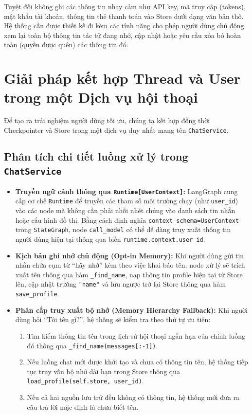 \begin{aiwarning}
Tuyệt đối không ghi các thông tin nhạy cảm như API key, mã truy cập (tokens), mật khẩu tài khoản, thông tin thẻ thanh toán vào Store dưới dạng văn bản thô. Hệ thống cần được thiết kế đi kèm các tính năng cho phép người dùng chủ động xem lại toàn bộ thông tin tác tử đang nhớ, cập nhật hoặc yêu cầu xóa bỏ hoàn toàn (quyền được quên) các thông tin đó.
\end{aiwarning}

\section{Giải pháp kết hợp Thread và User trong một Dịch vụ hội thoại}

Để tạo ra trải nghiệm người dùng tối ưu, chúng ta kết hợp đồng thời Checkpointer và Store trong một dịch vụ duy nhất mang tên \texttt{ChatService}.

\begingroup

\endgroup

\subsection{Phân tích chi tiết luồng xử lý trong \texttt{ChatService}}
\begin{itemize}
  \item \textbf{Truyền ngữ cảnh thông qua \texttt{Runtime[UserContext]}:} LangGraph cung cấp cơ chế \texttt{Runtime} để truyền các tham số môi trường chạy (như \texttt{user\_id}) vào các node mà không cần phải nhồi nhét chúng vào danh sách tin nhắn hoặc cấu hình đồ thị. Bằng cách định nghĩa \texttt{context\_schema=UserContext} trong \texttt{StateGraph}, node \texttt{call\_model} có thể dễ dàng truy xuất thông tin người dùng hiện tại thông qua biến \texttt{runtime.context.user\_id}.
  \item \textbf{Kịch bản ghi nhớ chủ động (Opt-in Memory):} Khi người dùng gửi tin nhắn chứa cụm từ ``hãy nhớ'' kèm theo việc khai báo tên, node xử lý sẽ trích xuất tên thông qua hàm \texttt{\_find\_name}, nạp thông tin profile hiện tại từ Store lên, cập nhật trường \texttt{"name"} và lưu ngược trở lại Store thông qua hàm \texttt{save\_profile}.
  \item \textbf{Phân cấp truy xuất bộ nhớ (Memory Hierarchy Fallback):} Khi người dùng hỏi ``Tôi tên gì?'', hệ thống sẽ kiểm tra theo thứ tự ưu tiên:
  \begin{enumerate}
    \item Tìm kiếm thông tin tên trong lịch sử hội thoại ngắn hạn của chính luồng đó thông qua \texttt{\_find\_name(messages[:-1])}.
    \item Nếu luồng chat mới được khởi tạo và chưa có thông tin tên, hệ thống tiếp tục truy vấn bộ nhớ dài hạn trong Store thông qua \texttt{load\_profile(self.store, user\_id)}.
    \item Nếu cả hai nguồn lưu trữ đều không có thông tin, hệ thống mới đưa ra câu trả lời mặc định là chưa biết tên.
  \end{enumerate}
\end{itemize}

